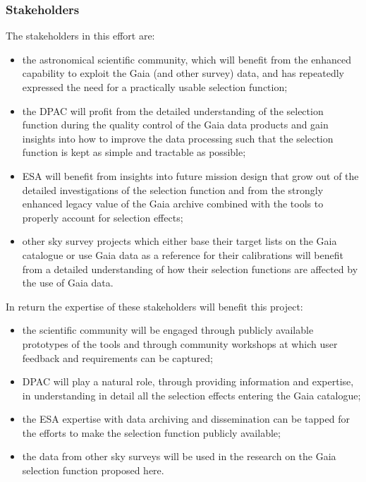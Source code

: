\subsubsection{Stakeholders}
\label{sec:stakeholders}

The stakeholders in this effort are:
\begin{itemize}
    \item the astronomical scientific community, which will benefit from the enhanced capability to exploit the Gaia (and other survey) data, and has repeatedly expressed the need for a practically usable selection function;
    \item the DPAC will profit from the detailed understanding of the selection function during the quality control of the Gaia data products and gain insights into how to improve the data processing such that the selection function is kept as simple and tractable as possible;
    \item ESA will benefit from insights into future mission design that grow out of the detailed investigations of the selection function and from the strongly enhanced legacy value of the Gaia archive combined with the tools to properly account for selection effects;
    \item other sky survey projects which either base their target lists on the Gaia catalogue or use Gaia data as a reference for their calibrations will benefit from a detailed understanding of how their selection functions are affected by the use of Gaia data.
\end{itemize}
In return the expertise of these stakeholders will benefit this project:
\begin{itemize}
    \item the scientific community will be engaged through publicly available prototypes of the {\acro} tools and through community workshops at which user feedback and requirements can be captured;
    \item DPAC will play a natural role, through providing information and expertise, in understanding in detail all the selection effects entering the Gaia catalogue;
    \item the ESA expertise with data archiving and dissemination can be tapped for the efforts to make the selection function publicly available; 
    \item the data from other sky surveys will be used in the research on the Gaia selection function proposed here.
\end{itemize}
 
